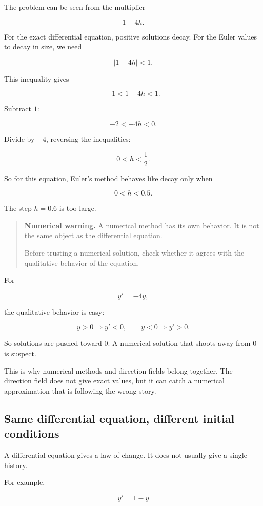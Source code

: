 The problem can be seen from the multiplier

\[
1-4h.
\]

For the exact differential equation, positive solutions decay.  For the Euler values to
decay in size, we need

\[
|1-4h|<1.
\]

This inequality gives

\[
-1<1-4h<1.
\]

Subtract \(1\):

\[
-2<-4h<0.
\]

Divide by \(-4\), reversing the inequalities:

\[
0<h<\frac12.
\]

So for this equation, Euler's method behaves like decay only when

\[
0<h<0.5.
\]

The step \(h=0.6\) is too large.

\begin{quote}
\textbf{Numerical warning.}
A numerical method has its own behavior.  It is not the same object as the
differential equation.

Before trusting a numerical solution, check whether it agrees with the qualitative
behavior of the equation.
\end{quote}

For

\[
y'=-4y,
\]

the qualitative behavior is easy:

\[
y>0 \Longrightarrow y'<0,
\qquad
y<0 \Longrightarrow y'>0.
\]

So solutions are pushed toward \(0\).  A numerical solution that shoots away from
\(0\) is suspect.

This is why numerical methods and direction fields belong together.  The direction field
does not give exact values, but it can catch a numerical approximation that is following
the wrong story.

\subsection{Same differential equation, different initial conditions}
\label{subsec:same-de-different-initial-conditions}

A differential equation gives a law of change.  It does not usually give a single history.

For example,

\[
y'=1-y
\]

